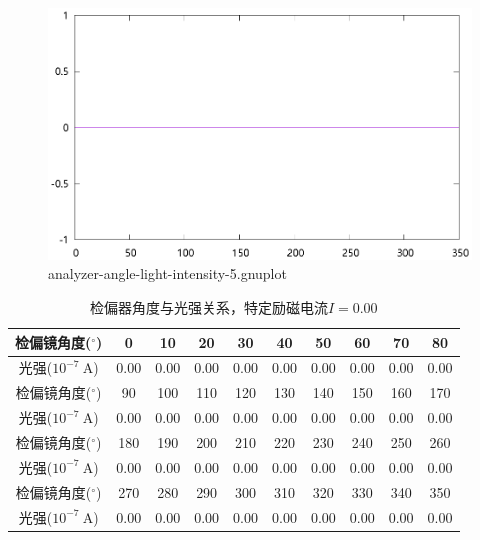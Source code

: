 \documentclass{ctexart}
\newcommand{\si}[1]{\  \mathrm{#1}}
\begin{document}
    \begin{figure}[H]
      \centering
      \includegraphics[width=\linewidth]{../output/analyzer-angle-light-intensity-5.gnuplot}
      \caption{analyzer-angle-light-intensity-5.gnuplot}
      \label{fig:analyzer-angle-light-intensity-5.gnuplot}
    \end{figure}
    \begin{table}[H]
      \centering
      \begin{tabular}{|c|c|c|c|c|c|c|c|c|c|}
        \hline
        检偏镜角度(${}^{\circ}$) & 0 & 10 & 20 & 30 & 40 & 50 & 60 & 70 & 80 \\\hline
        光强($10^{-7} \si{A}$)  & 0.00 & 0.00 & 0.00 & 0.00 & 0.00 & 0.00 & 0.00 & 0.00 & 0.00 \\\hline
        检偏镜角度(${}^{\circ}$) & 90 & 100 & 110 & 120 & 130 & 140 & 150 & 160 & 170 \\\hline
        光强($10^{-7} \si{A}$)  & 0.00 & 0.00 & 0.00 & 0.00 & 0.00 & 0.00 & 0.00 & 0.00 & 0.00  \\\hline
        检偏镜角度(${}^{\circ}$) & 180 & 190 & 200 & 210 & 220 & 230 & 240 & 250 & 260  \\\hline
        光强($10^{-7} \si{A}$)  & 0.00 & 0.00 & 0.00 & 0.00 & 0.00 & 0.00 & 0.00 & 0.00 & 0.00 \\\hline
        检偏镜角度(${}^{\circ}$) & 270 & 280 & 290 & 300 & 310 & 320 & 330 & 340 & 350 \\\hline
        光强($10^{-7} \si{A}$)  & 0.00 & 0.00 & 0.00 & 0.00 & 0.00 & 0.00 & 0.00 & 0.00 & 0.00 \\\hline
      \end{tabular}
      \caption{检偏器角度与光强关系，特定励磁电流$I=0.00$}
    \end{table}
\end{document}
